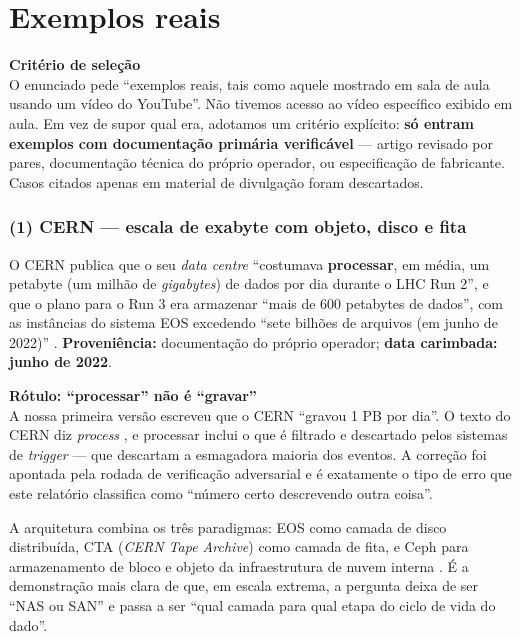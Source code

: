 \documentclass[11pt,a4paper]{article}
\newcommand{\destaque}[2]{%
  \begin{center}\begin{minipage}{0.96\textwidth}
  \colorbox{fundo}{\begin{minipage}{\dimexpr\linewidth-2\fboxsep}
  \vspace{2pt}\textbf{\color{azul}\small #1}\\[1pt]\footnotesize #2\vspace{3pt}
  \end{minipage}}\end{minipage}\end{center}}
\newcommand{\correcao}[2]{%
  \begin{center}\begin{minipage}{0.96\textwidth}
  \colorbox{fundo}{\begin{minipage}{\dimexpr\linewidth-2\fboxsep}
  \vspace{2pt}\textbf{\color{laranja}\small #1}\\[1pt]\footnotesize #2\vspace{3pt}
  \end{minipage}}\end{minipage}\end{center}}
\begin{document}
\section{Exemplos reais}
\label{sec:exemplos}

\destaque{Critério de seleção}{%
O enunciado pede ``exemplos reais, tais como aquele mostrado em sala de aula usando um vídeo do
YouTube''. Não tivemos acesso ao vídeo específico exibido em aula. Em vez de supor qual era,
adotamos um critério explícito: \textbf{só entram exemplos com documentação primária verificável}
--- artigo revisado por pares, documentação técnica do próprio operador, ou especificação de
fabricante. Casos citados apenas em material de divulgação foram descartados.}

\subsubsection*{(1) CERN --- escala de exabyte com objeto, disco e fita}

O CERN publica que o seu \textit{data centre} ``costumava \textbf{processar}, em média, um petabyte
(um milhão de \textit{gigabytes}) de dados por dia durante o LHC Run 2'', e que o plano para o Run 3
era armazenar ``mais de 600 petabytes de dados'', com as instâncias do sistema EOS excedendo ``sete
bilhões de arquivos (em junho de 2022)'' \cite{cernstorage}. \textbf{Proveniência:} documentação do
próprio operador; \textbf{data carimbada: junho de 2022}.

\correcao{Rótulo: ``processar'' não é ``gravar''}{%
A nossa primeira versão escreveu que o CERN ``gravou 1 PB por dia''. O texto do CERN diz
\emph{process} \cite{cernstorage}, e processar inclui o que é filtrado e descartado pelos sistemas
de \textit{trigger} --- que descartam a esmagadora maioria dos eventos. A correção foi apontada pela
rodada de verificação adversarial e é exatamente o tipo de erro que este relatório classifica como
``número certo descrevendo outra coisa''.}

A arquitetura combina os três paradigmas: EOS como camada de disco distribuída, CTA (\textit{CERN
Tape Archive}) como camada de fita, e Ceph para armazenamento de bloco e objeto da infraestrutura de
nuvem interna \cite{cerncta}. É a demonstração mais clara de que, em escala extrema, a pergunta deixa
de ser ``NAS ou SAN'' e passa a ser ``qual camada para qual etapa do ciclo de vida do dado''.
\end{document}
